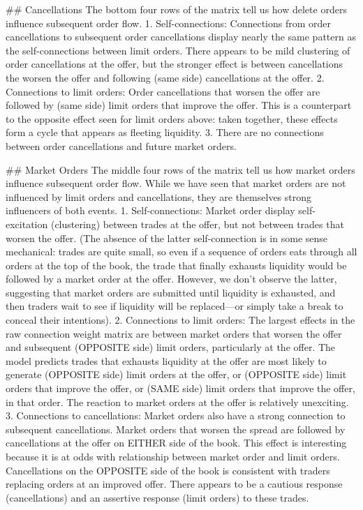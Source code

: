 		\#\# Cancellations
		The bottom four rows of the matrix tell us how delete orders influence subsequent order flow.
		1. Self-connections: Connections from order cancellations to subsequent order cancellations display nearly the same pattern as the self-connections between limit orders. There appears to be mild clustering of order cancellations at the offer, but the stronger effect is between cancellations the worsen the offer and following (same side) cancellations at the offer.
		2. Connections to limit orders: Order cancellations that worsen the offer are followed by (same side) limit orders that improve the offer. This is a counterpart to the opposite effect seen for limit orders above: taken together, these effects form a cycle that appears as fleeting liquidity.
		3. There are no connections between order cancellations and future market orders.

		\#\# Market Orders
		The middle four rows of the matrix tell us how market orders influence subsequent order flow. While  we have seen that market orders are not influenced by limit orders and cancellations, they are themselves strong influencers of both events.
		1. Self-connections: Market order display self-excitation (clustering) between trades at the offer, but not between trades that worsen the offer. (The absence of the latter self-connection is in some sense mechanical: trades are quite small, so even if a sequence of orders eats through all orders at the top of the book, the trade that finally exhausts liquidity would be followed by a market order at the offer. However, we don’t observe the latter, suggesting that market orders are submitted until liquidity is exhausted, and then traders wait to see if liquidity will be replaced—or simply take a break to conceal their intentions).
		2. Connections to limit orders: The largest effects in the raw connection weight matrix are between market orders that worsen the offer and subsequent (OPPOSITE side) limit orders, particularly at the offer. The model predicts trades that exhausts liquidity at the offer are most likely to generate (OPPOSITE side) limit orders at the offer, or (OPPOSITE side) limit orders that improve the offer, or (SAME side) limit orders that improve the offer, in that order. The reaction to market orders at the offer is relatively unexciting.
		3. Connections to cancellations: Market orders also have a strong connection to subsequent cancellations. Market orders that worsen the spread are followed by cancellations at the offer on EITHER side of the book. This effect is interesting because it is at odds with relationship between market order and limit orders. Cancellations on the OPPOSITE side of the book is consistent with traders replacing orders at an improved offer. There appears to be a cautious response (cancellations) and an assertive response (limit orders) to these trades.

